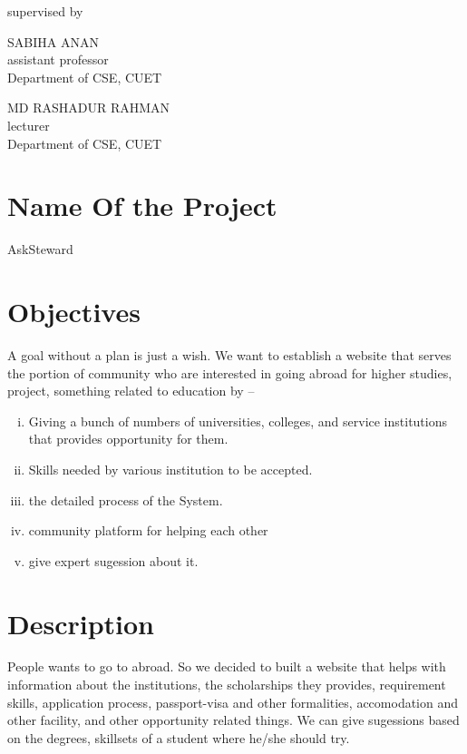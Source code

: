 \documentclass[a4paper,12pt]{report}
\begin{document}
\begin{titlepage}
	\vspace{2cm}
	supervised by

	\parbox[l]{8cm}{\begin{center}

			SABIHA ANAN\\
			assistant professor\\
			Department of CSE, CUET
		\end{center}
	}
	\parbox[r]{8cm}{\begin{center}

			MD RASHADUR RAHMAN\\
			lecturer \\
			Department of CSE, CUET
		\end{center}
	}

	\vfill
\end{titlepage}


\onehalfspacing

\section*{Name Of the Project}
AskSteward
\section*{Objectives}
A goal without a plan is just a wish. We want to establish a website that serves the portion of community who are interested in going abroad for higher studies, project, something related to education by --
\begin{enumerate}[i.]
	\item Giving a bunch of numbers of universities, colleges, and service institutions that provides opportunity for them.
	\item Skills needed by various institution to be accepted.
	\item the detailed process of the System.
	\item community platform for helping each other
	\item give expert sugession about it.
\end{enumerate}
\section*{Description}
People wants to go to abroad. So we decided to built a website that helps with information about the institutions, the scholarships they provides, requirement skills, application process, passport-visa and other formalities, accomodation and other facility, and other opportunity related things. We can give sugessions based on the degrees, skillsets of a student where he/she should try.
\end{document}
